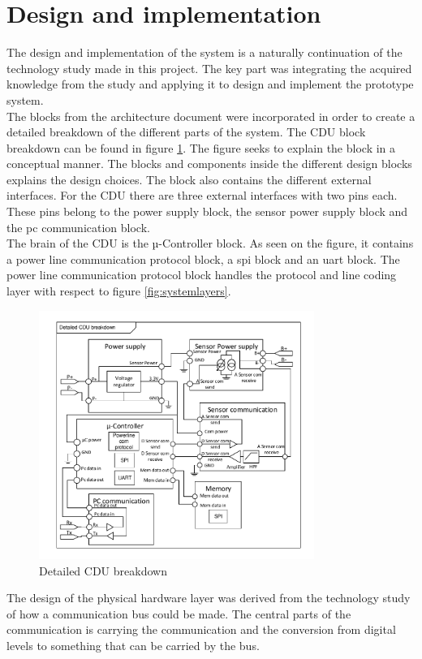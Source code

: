 \section{Design and implementation}
The design and implementation of the system is a naturally continuation of the technology study made in this project. The key part was integrating the acquired knowledge from the study and applying it to design and implement the prototype system.\\
The blocks from the architecture document were incorporated in order to create a detailed breakdown of the different parts of the system. The CDU block breakdown can be found in figure \ref{fig:detailedCDU}. The figure seeks to explain the block in a conceptual manner. The blocks and components inside the different design blocks explains the design choices. The block also contains the different external interfaces. For the CDU there are three external interfaces with two pins each. These pins belong to the power supply block, the sensor power supply block and the pc communication block.\\
The brain of the CDU is the µ-Controller block. As seen on the figure, it contains a power line communication protocol block, a spi block and an uart block. The power line communication protocol block handles the protocol and line coding layer with respect to figure \ref{fig:systemlayers}.
\begin{figure}[H]
	\centering
	\includegraphics[width=0.8\textwidth]{billeder/11ProjectDescription/detailedCDU}
	\caption{Detailed CDU breakdown}
	\label{fig:detailedCDU}
\end{figure}
The design of the physical hardware layer was derived from the technology study of how a communication bus could be made. The central parts of the communication is carrying the communication and the conversion from digital levels to something that can be carried by the bus.\\ 
